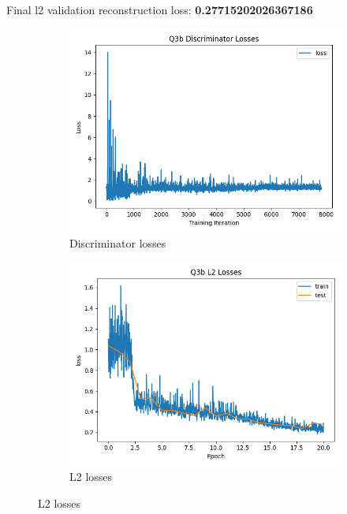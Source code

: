 \documentclass{article}
\begin{document}
Final l2 validation reconstruction loss: \textbf{0.27715202026367186} \\
\begin{figure}[H]
    \centering
    \begin{subfigure}{0.45\textwidth}
        \centering
        \includegraphics[width=\textwidth]{figures/q3b_gan_losses.png}
        \caption{Discriminator losses}
    \end{subfigure}
    \begin{subfigure}{0.45\textwidth}
        \centering
        \includegraphics[width=\textwidth]{figures/q3b_l2_losses.png}
        \caption{L2 losses}
    \end{subfigure}

\end{figure}
\end{document}
